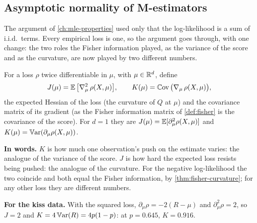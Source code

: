 \subsection{Asymptotic normality of M-estimators}
\label{sec:mest-normal}

The argument of \cref{ch:mle-properties} used only that the log-likelihood is a sum of i.i.d.\ terms.
Every empirical loss is one, so the argument goes through, with one change: the two roles the Fisher information played, as the variance of the score and as the curvature, are now played by two different numbers.

\begin{definition}
\label{def:jk}
For a loss $\rho$ twice differentiable in $\mu$, with $\mu \in \mathbb{R}^d$, define
\[
J(\mu) = \operatorname*{\mathbb{E}}\big[\nabla^2_\mu\,\rho(X, \mu)\big], \qquad K(\mu) = \operatorname*{\mathbb{C}\text{ov}}\big(\nabla_\mu\,\rho(X, \mu)\big),
\]
the expected Hessian of the loss (the curvature of $Q$ at $\mu$) and the covariance matrix of its gradient (as the Fisher information matrix of \cref{def:fisher} is the covariance of the score). For $d = 1$ they are $J(\mu) = \operatorname*{\mathbb{E}}[\partial^2_\mu\rho(X, \mu)]$ and $K(\mu) = \operatorname*{\mathbb{V}\text{ar}}(\partial_\mu\rho(X, \mu))$.
\end{definition}

\begin{inwords}
\textbf{In words.} $K$ is how much one observation's push on the estimate varies: the analogue of the variance of the score. $J$ is how hard the expected loss resists being pushed: the analogue of the curvature. For the negative log-likelihood the two coincide and both equal the Fisher information, by \cref{thm:fisher-curvature}; for any other loss they are different numbers.
\par\smallskip
\textbf{For the kiss data.} With the squared loss, $\partial_\mu\rho = -2(R - \mu)$ and $\partial^2_\mu\rho = 2$, so $J = 2$ and $K = 4\operatorname*{\mathbb{V}\text{ar}}(R) = 4p(1 - p)$: at $p = 0.645$, $K = 0.916$.
\end{inwords}


